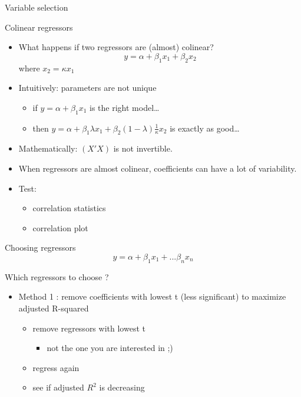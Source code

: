 \documentclass[
  ignorenonframetext,
  aspectratio=169,
]{beamer}
\providecommand{\tightlist}{%
  \setlength{\itemsep}{0pt}\setlength{\parskip}{0pt}}\usepackage{longtable,booktabs,array}
\begin{document}
\begin{frame}{Variable selection}
\begin{block}{Colinear regressors}
\protect\hypertarget{colinear-regressors}{}
\begin{itemize}[<+->]
\tightlist
\item
  What happens if two regressors are (almost) colinear?
  \[y = \alpha + \beta_1 x_1 + \beta_2 x_2\] where \(x_2 = \kappa x_1\)
\item
  Intuitively: parameters are not unique

  \begin{itemize}[<+->]
  \tightlist
  \item
    if \(y = \alpha + \beta_1 x_1\) is the right model\ldots{}
  \item
    then
    \(y = \alpha + \beta_1 \lambda x_1 + \beta_2 (1-\lambda) \frac{1}{\kappa} x_2\)
    is exactly as good\ldots{}
  \end{itemize}
\item
  Mathematically: \((X'X)\) is not invertible.
\item
  When regressors are almost colinear, coefficients can have a lot of
  variability.
\item
  Test:

  \begin{itemize}[<+->]
  \tightlist
  \item
    correlation statistics
  \item
    correlation plot
  \end{itemize}
\end{itemize}
\end{block}

\begin{block}{Choosing regressors}
\protect\hypertarget{choosing-regressors}{}
\[y = \alpha + \beta_1 x_1 + ... \beta_n x_n\]

Which regressors to choose ?

\begin{itemize}
\tightlist
\item
  Method 1 : remove coefficients with lowest t (less significant) to
  maximize adjusted R-squared

  \begin{itemize}
  \tightlist
  \item
    remove regressors with lowest t

    \begin{itemize}
    \tightlist
    \item
      not the one you are interested in ;)
    \end{itemize}
  \item
    regress again
  \item
    see if adjusted \(R^2\) is decreasing


\end{itemize}
\end{itemize}
\end{block}
\end{frame}
\end{document}

